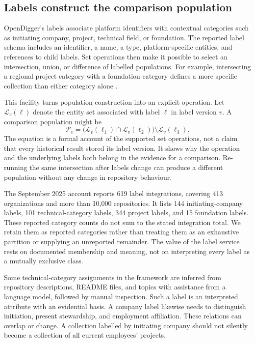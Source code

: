 \subsection{Labels construct the comparison population}
OpenDigger's labels associate platform identifiers with contextual categories such as initiating company, project, technical field, or foundation. The reported label schema includes an identifier, a name, a type, platform-specific entities, and references to child labels. Set operations then make it possible to select an intersection, union, or difference of labelled populations. For example, intersecting a regional project category with a foundation category defines a more specific collection than either category alone \citep[Appendix A.1]{wang2026digger}.

This facility turns population construction into an explicit operation. Let \(\mathcal L_v(\ell)\) denote the entity set associated with label \(\ell\) in label version \(v\). A comparison population might be
\begin{equation}
 \mathcal P_v=
 \bigl(\mathcal L_v(\ell_1)\cap\mathcal L_v(\ell_2)\bigr)
 \setminus\mathcal L_v(\ell_3).
 \label{eq:ch6-population}
\end{equation}
The equation is a formal account of the supported set operations, not a claim that every historical result stored its label version. It shows why the operation and the underlying labels both belong in the evidence for a comparison. Re-running the same intersection after labels change can produce a different population without any change in repository behaviour.

The September 2025 account reports 619 label integrations, covering 413 organizations and more than 10,000 repositories. It lists 144 initiating-company labels, 101 technical-category labels, 344 project labels, and 15 foundation labels. These reported category counts do not sum to the stated integration total. We retain them as reported categories rather than treating them as an exhaustive partition or supplying an unreported remainder. The value of the label service rests on documented membership and meaning, not on interpreting every label as a mutually exclusive class.

Some technical-category assignments in the framework are inferred from repository descriptions, README files, and topics with assistance from a language model, followed by manual inspection. Such a label is an interpreted attribute with an evidential basis. A company label likewise needs to distinguish initiation, present stewardship, and employment affiliation. These relations can overlap or change. A collection labelled by initiating company should not silently become a collection of all current employees' projects.

